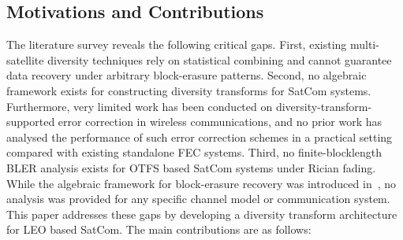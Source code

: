 \documentclass[lettersize,journal]{IEEEtran}
\begin{document}
\subsection{Motivations and Contributions}
\label{sec:motivations_contributions}
The literature survey reveals the following critical gaps. First, existing multi-satellite diversity techniques rely on statistical combining and cannot
  guarantee data recovery under arbitrary block-erasure patterns. Second, no algebraic framework exists for constructing diversity transforms for SatCom
  systems. Furthermore, very limited work has been conducted on diversity-transform-supported error correction in wireless communications, and no prior work has analysed the performance of such error correction schemes in a practical setting compared with existing standalone FEC systems. Third, no
  finite-blocklength BLER analysis exists for OTFS based SatCom systems under Rician fading. While the algebraic framework for block-erasure recovery was introduced in~\cite{Arikan2025_patent}, no analysis was provided for any specific channel model or communication system. This paper addresses these gaps by
  developing a diversity transform architecture for LEO based SatCom. The main contributions are as follows:
\end{document}
